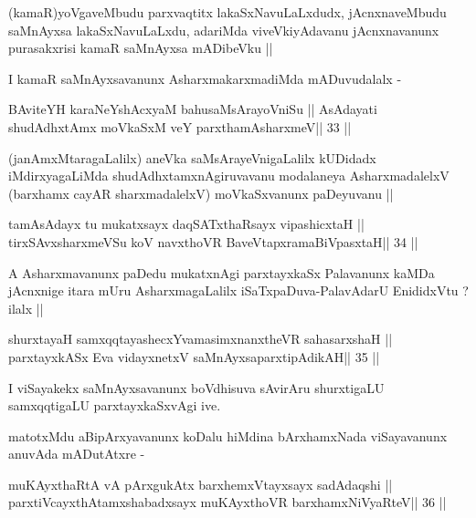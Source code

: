 \begin{artha}
(kamaR)yoVgaveMbudu parxvaqtitx lakaSxNavuLaLxdudx, jAcnxnaveMbudu
  saMnAyxsa lakaSxNavuLaLxdu, adariMda viveVkiyAdavanu jAcnxnavanunx
  purasakxrisi kamaR saMnAyxsa mADibeVku || 

I kamaR saMnAyxsavanunx AsharxmakarxmadiMda mADuvudalalx -
\end{artha}

\begin{shl}
BAviteYH karaNeYshAcxyaM bahusaMsArayoVniSu ||
AsAdayati shudAdhxtAmx moVkaSxM veY parxthamAsharxmeV\hfill || 33 ||
\end{shl}

\begin{artha}
(janAmxMtaragaLalilx) aneVka saMsArayeVnigaLalilx kUDidadx
  iMdirxyagaLiMda shudAdhxtamxnAgiruvavanu modalaneya AsharxmadalelxV
  (barxhamx cayAR sharxmadalelxV) moVkaSxvanunx paDeyuvanu ||
\end{artha}

\begin{shl}
tamAsAdayx tu mukatxsayx daqSATxthaRsayx vipashicxtaH ||
tirxSAvxsharxmeVSu koV navxthoVR BaveVtapxramaBiVpasxtaH\hfill || 34 ||
\end{shl}

\begin{artha}
A Asharxmavanunx paDedu mukatxnAgi parxtayxkaSx Palavanunx kaMDa
jAcnxnige itara mUru AsharxmagaLalilx iSaTxpaDuva-PalavAdarU
EnididxVtu ? ilalx ||
\end{artha}

\begin{shl}
shurxtayaH samxqqtayashecxYvamasimxnanxtheVR sahasarxshaH ||
parxtayxkASx Eva vidayxnetxV saMnAyxsaparxtipAdikAH\hfill || 35 ||
\end{shl}

\begin{artha}
I viSayakekx saMnAyxsavanunx boVdhisuva sAvirAru shurxtigaLU
samxqqtigaLU parxtayxkaSxvAgi ive.
\end{artha}

\begin{artha}
matotxMdu aBipArxyavanunx koDalu hiMdina bArxhamxNada viSayavanunx
anuvAda mADutAtxre -
\end{artha}

\begin{shl}
muKAyxthaRtA vA pArxgukAtx barxhemxVtayxsayx sadAdaqshi ||
parxtiVcayxthA\s\s tamxshabadxsayx muKAyxthoVR barxhamxNiVyaRteV\hfill || 36 ||
\end{shl}

